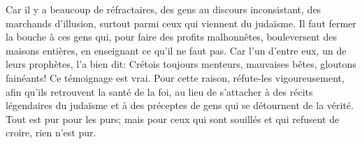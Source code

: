 Car il y a beaucoup de réfractaires, des gens au discours inconsistant,
	des marchands d’illusion, surtout parmi ceux qui viennent du judaïsme.
Il faut fermer la bouche à ces gens qui, pour faire des profits malhonnêtes,
	bouleversent des maisons entières, en enseignant ce qu’il ne faut pas.
Car l’un d’entre eux, un de leurs prophètes, l’a bien dit:
	Crétois toujours menteurs, mauvaises bêtes, gloutons fainéants!
	Ce témoignage est vrai.
Pour cette raison, réfute-les vigoureusement,
	afin qu’ils retrouvent la santé de la foi,
	au lieu de s’attacher à des récits légendaires du judaïsme
	et à des préceptes de gens qui se détournent de la vérité.
Tout est pur pour les purs;
	mais pour ceux qui sont souillés et qui refusent de croire, rien n’est pur.
